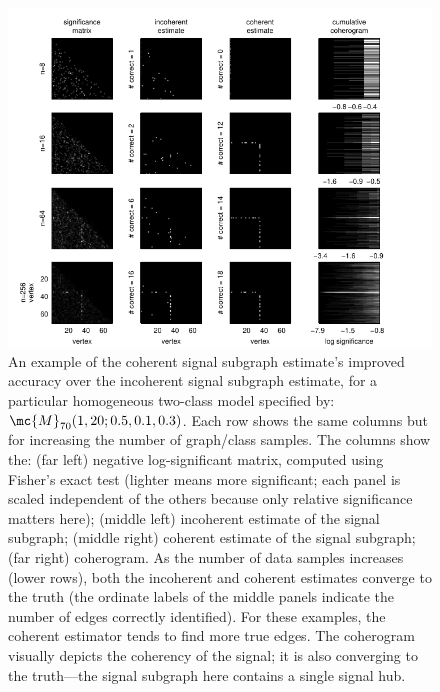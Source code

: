 \documentclass[10pt,journal,cspaper,compsoc]{IEEEtran}
\begin{document}
\begin{figure}[tb!]
	\centering
		\includegraphics[width=1.0\linewidth]{../figs/homo_V70_s20_p10_q30_SigIncCohErogram.pdf}
	\caption{An example of the coherent signal subgraph estimate's improved accuracy over the incoherent signal subgraph estimate, for a particular homogeneous two-class model specified by: $\mc{M}_{70}(1,20;0.5,0.1,0.3)$. Each row shows the same columns but for increasing the number of graph/class samples.  The columns show the: (far left) negative log-significant matrix, computed using Fisher's exact test (lighter means more significant; each panel is scaled independent of the others because only relative significance matters here); (middle left) incoherent estimate of the signal subgraph; (middle right) coherent estimate of the signal subgraph; (far right) coherogram.  As the number of data samples increases (lower rows), both the incoherent and coherent estimates converge to the truth (the ordinate labels of the middle panels indicate the number of edges correctly identified).  For these examples, the coherent estimator tends to find more true edges.  The coherogram visually depicts the coherency of the signal; it is also converging to the truth---the signal subgraph here contains a single signal hub.}
	\label{fig:4x4}
\end{figure}
\end{document}
